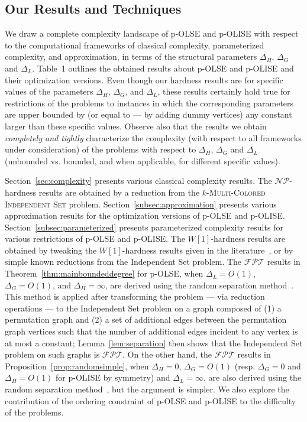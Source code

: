 \documentclass[11pt]{article}
\newcommand{\NP}{\mbox{$\mathcal{NP}$}}
\newcommand{\FPT}{\text{$\mathcal{FPT}$}}
\begin{document}
\subsection{Our Results and Techniques}\label{subsec:results}
We draw a complete complexity landscape of p-OLSE and p-OLISE with respect to the computational frameworks of classical complexity, parameterized complexity, and approximation, in terms of the structural parameters $\Delta_H$, $\Delta_G$ and $\Delta_L$. Table~1 outlines the obtained results about p-OLSE and p-OLISE and their optimization versions. Even though our hardness results are for specific values of the parameters $\Delta_H$, $\Delta_G$, and $\Delta_L$, these results certainly hold true for restrictions of the problems to instances in which the corresponding parameters are upper bounded by (or equal to --- by adding dummy vertices) any constant larger than these specific values. Observe also that the results we obtain {\em completely and tightly} characterize the complexity (with respect to all frameworks under consideration) of the problems with respect to $\Delta_H$, $\Delta_G$ and $\Delta_L$ (unbounded vs. bounded, and when applicable, for different specific values).

Section~\ref{sec:complexity} presents various classical complexity results. The \NP-hardness results are obtained by a reduction from the \textsc{$k$-Multi-Colored Independent Set} problem. Section~\ref{subsec:approximation} presents various approximation results for the optimization versions of p-OLSE and p-OLISE. Section~\ref{subsec:parameterized} presents parameterized complexity results for various restrictions of p-OLSE and p-OLISE. The $W[1]$-hardness results are obtained by tweaking the $W[1]$-hardness results given in the literature~\cite{xiuzhen,evans}, or by simple known reductions from the {\sc Independent Set} problem. The $\FPT$ results in Theorem~\ref{thm:mainboundeddegree} for p-OLSE, when $\Delta_L = O(1)$, $\Delta_G=O(1)$, and $\Delta_H = \infty$, are derived using the random separation method~\cite{cai}. This method is applied after transforming the problem --- via reduction operations --- to the {\sc Independent Set} problem on a graph composed of (1) a permutation graph and (2) a set of additional edges between the permutation graph vertices such that the number of additional edges incident to any vertex is at most a constant; Lemma~\ref{lem:separation} then shows that the {\sc Independent Set} problem on such graphs is $\FPT$. On the other hand, the $\FPT$ results in Proposition~\ref{prop:randomsimple}, when $\Delta_H=0$, $\Delta_G=O(1)$ (resp. $\Delta_G=0$ and $\Delta_H=O(1)$ for p-OLISE by symmetry) and $\Delta_L=\infty$, are also derived using the random separation method~\cite{cai}, but the argument is simpler. We also explore the contribution of the ordering constraint of p-OLSE and p-OLISE to the difficulty of the problems.
\end{document}
